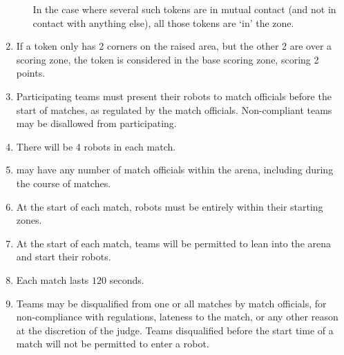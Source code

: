 \begin{enumerate}
\begin{enumerate}
            In the case where several such tokens are in mutual contact (and not in
            contact with anything else), all those tokens are `in' the zone.
    \end{enumerate}
  \item If a token only has 2 corners on the raised area, but the other 2 are over
        a scoring zone, the token is considered in the base scoring zone, scoring 2 points.
  \item Participating teams must present their robots to match officials before
        the start of matches, as regulated by the match officials. Non-compliant
        teams may be disallowed from participating.
  \item There will be 4 robots in each match.
  \item \org may have any number of match officials within the arena, including
        during the course of matches.
  \item At the start of each match, robots must be entirely within their
        starting zones.
  \item At the start of each match, teams will be permitted to lean into the
        arena and start their robots.
  \item Each match lasts $120$ seconds.
  \item Teams may be disqualified from one or all matches by match officials,
        for non-compliance with regulations, lateness to the match, or any other
        reason at the discretion of the judge. Teams disqualified before the
        start time of a match will not be permitted to enter a robot.
\end{enumerate}
